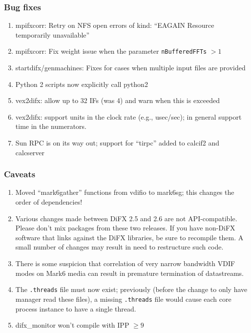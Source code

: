 \subsubsection{Bug fixes}

\begin{enumerate}
\item mpifxcorr: Retry on NFS open errors of kind: ``EAGAIN Resource temporarily unavailable''
\item mpifxcorr: Fix weight issue when the parameter {\tt nBufferedFFTs} $ > 1$
\item startdifx/genmachines: Fixes for cases when multiple input files are provided
\item Python 2 scripts now explicitly call python2
\item vex2difx: allow up to 32 IFs (was 4) and warn when this is exceeded
\item vex2difx: support units in the clock rate (e.g., usec/sec); in general support time in the numerators.
\item Sun RPC is on its way out; support for ``tirpc'' added to calcif2 and calcserver
\end{enumerate}

\subsubsection{Caveats}

\begin{enumerate}
\item Moved “mark6gather” functions from vdifio to mark6sg; this changes the order of dependencies!
\item Various changes made between DiFX 2.5 and 2.6 are not API-compatible. Please don't mix packages from these two releases. If you have non-DiFX software that links against the DiFX libraries, be sure to recompile them. A small number of changes may result in need to restructure such code.
\item There is some suspicion that correlation of very narrow bandwidth VDIF modes on Mark6 media can result in premature termination of datastreams.
\item The {\tt .threads} file must now exist; previously (before the change to only have manager read these files), a missing {\tt .threads} file would cause each core process instance to have a single thread.
\item difx\_monitor won't compile with IPP $\ge 9$
\end{enumerate}

